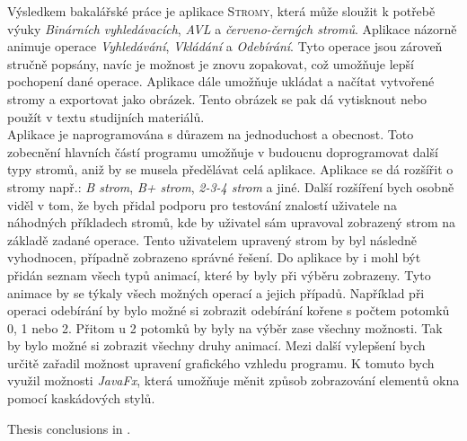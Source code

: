 \documentclass[
  biblatex=false,
  font=serif,
  glossaries=false,
  tables=false,
  theorems=false,
  index
]{kidiplom}
\begin{document}
\begin{kiconclusions}
\indent \indent Výsledkem bakalářské práce je aplikace \textsc{Stromy}, která může sloužit k potřebě výuky \textit{Binárních vyhledávacích}, \textit{AVL} a \textit{červeno-černých stromů}. Aplikace názorně animuje operace \textit{Vyhledávání}, \textit{Vkládání} a \textit{Odebírání}. Tyto operace jsou zároveň stručně popsány, navíc je možnost je znovu zopakovat, což umožňuje lepší pochopení dané operace. Aplikace dále umožňuje ukládat a načítat vytvořené stromy a exportovat jako obrázek. Tento obrázek se pak dá vytisknout nebo použít v textu studijních materiálů.  \\
\indent Aplikace je naprogramována s důrazem na jednoduchost a obecnost. Toto zobecnění hlavních částí programu umožňuje v budoucnu doprogramovat další typy stromů, aniž by se musela předělávat celá aplikace. Aplikace se dá rozšířit o stromy  např.: \textit{B strom}, \textit{B+ strom}, \textit{2-3-4 strom} a jiné. Další rozšíření bych osobně viděl v tom, že bych přidal podporu pro testování znalostí uživatele na náhodných příkladech stromů, kde by uživatel sám upravoval zobrazený strom na základě zadané operace. Tento uživatelem upravený strom by byl následně vyhodnocen, případně zobrazeno správné řešení. Do aplikace by i mohl být přidán seznam všech typů animací, které by byly při výběru zobrazeny. Tyto animace by se týkaly všech možných operací a jejich případů. Například při operaci odebírání by bylo možné si zobrazit odebírání kořene s počtem potomků 0, 1 nebo 2. Přitom u 2 potomků by byly na výběr zase všechny možnosti. Tak by bylo možné si zobrazit všechny druhy animací. Mezi další vylepšení bych určitě zařadil možnost upravení grafického vzhledu programu. K tomuto bych využil možnosti \textit{JavaFx}, která umožňuje měnit způsob zobrazování elementů okna pomocí kaskádových stylů.

\end{kiconclusions}

\begin{kiconclusions}[english]
Thesis conclusions in .
\end{kiconclusions}

\appendix

\end{document}
